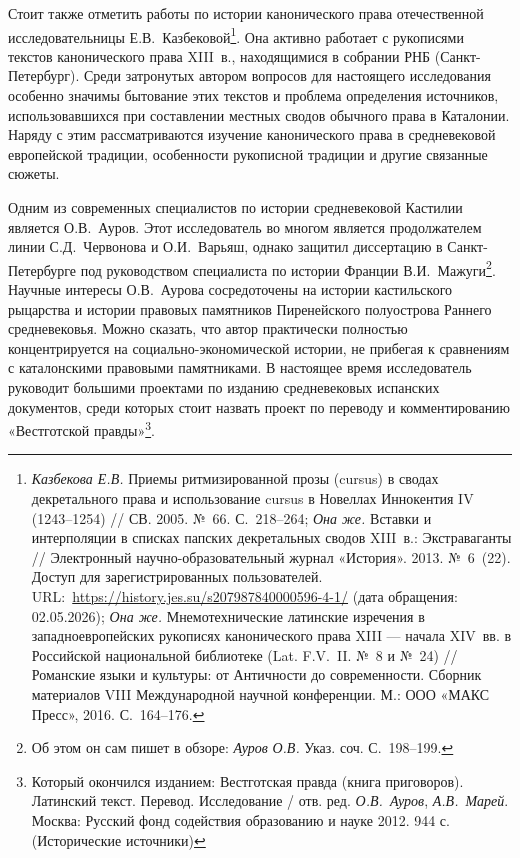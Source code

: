 Стоит также отметить работы по истории канонического права отечественной исследовательницы Е.В.~Казбековой\footnote{\emph{Казбекова Е.В.} Приемы ритмизированной прозы (cursus) в сводах декретального права и использование cursus в Новеллах Иннокентия IV (1243--1254) // СВ. 2005. №~66. С.~218--264; \emph{Она же.} Вставки и интерполяции в списках папских декретальных сводов XIII~в.: Экстраваганты // Электронный научно-образовательный журнал «История». 2013. №~6~(22). Доступ для зарегистрированных пользователей. URL:~\url{https://history.jes.su/s207987840000596-4-1/} (дата обращения: 02.05.2026); \emph{Она же.} Мнемотехнические латинские изречения в западноевропейских рукописях канонического права XIII --- начала XIV~вв. в Российской национальной библиотеке (Lat. F.V.~II. №~8 и №~24) // Романские языки и культуры: от Античности до современности. Сборник материалов VIII Международной научной конференции. М.: ООО «МАКС Пресс», 2016. С.~164--176.}. Она активно работает с рукописями текстов канонического права XIII~в., находящимися в собрании РНБ (Санкт-Петербург). Среди затронутых автором вопросов для настоящего исследования особенно значимы бытование этих текстов и проблема определения источников, использовавшихся при составлении местных сводов обычного права в Каталонии. Наряду с этим рассматриваются изучение канонического права в средневековой европейской традиции, особенности рукописной традиции и другие связанные сюжеты.

Одним из современных специалистов по истории средневековой Кастилии является О.В.~Ауров. Этот исследователь во многом является продолжателем линии С.Д.~Червонова и О.И.~Варьяш, однако защитил диссертацию в Санкт-Петербурге под руководством специалиста по истории Франции В.И.~Мажуги\footnote{Об этом он сам пишет в обзоре: \emph{Ауров}\emph{ О.В.} Указ. соч. С.~198--199.}. Научные интересы О.В.~Аурова сосредоточены на истории кастильского рыцарства и истории правовых памятников Пиренейского полуострова Раннего средневековья. Можно сказать, что автор практически полностью концентрируется на социально-экономической истории, не прибегая к сравнениям с каталонскими правовыми памятниками. В настоящее время исследователь руководит большими проектами по изданию средневековых испанских документов, среди которых стоит назвать проект по переводу и комментированию «Вестготской правды»\footnote{Который окончился изданием: Вестготская правда (книга приговоров). Латинский текст. Перевод. Исследование / отв. ред. \emph{О.В.~Ауров}, \emph{А.В.~Марей}. Москва: Русский фонд содействия образованию и науке 2012. 944 с. (Исторические источники)}.

